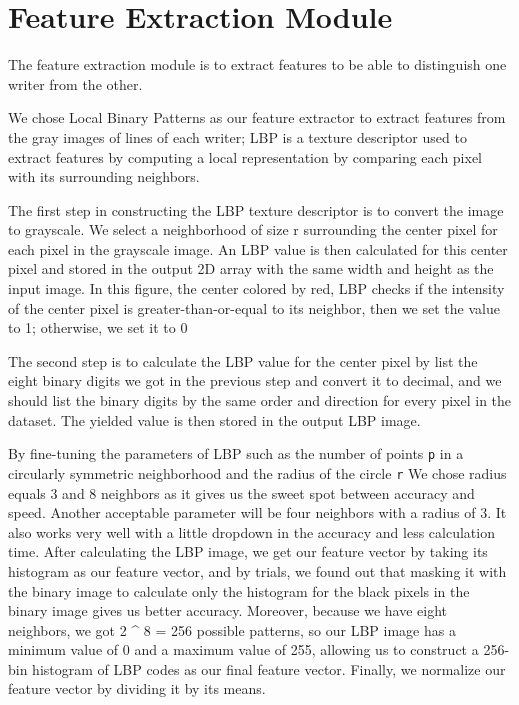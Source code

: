 \section{Feature Extraction Module}
The feature extraction module is to extract features to be able to distinguish one writer from the other.

We chose Local Binary Patterns as our feature extractor to extract features from the gray images of lines of each writer; LBP is a texture descriptor used to extract features by computing a local representation by comparing each pixel with its surrounding neighbors.

The first step in constructing the LBP texture descriptor is to convert the image to grayscale. We select a neighborhood of size r surrounding the center pixel for each pixel in the grayscale image. An LBP value is then calculated for this center pixel and stored in the output 2D array with the same width and height as the input image.
In this figure, the center colored by red, LBP checks if the intensity of the center pixel is greater-than-or-equal to its neighbor, then we set the value to 1; otherwise, we set it to 0

The second step is to calculate the LBP value for the center pixel by list the eight binary digits we got in the previous step and convert it to decimal, and we should list the binary digits by the same order and direction for every pixel in the dataset.
The yielded value is then stored in the output LBP image.

By fine-tuning the parameters of LBP such as the number of points \texttt{p} in a circularly symmetric neighborhood and the radius of the circle \texttt{r}
We chose radius equals 3 and 8 neighbors as it gives us the sweet spot between accuracy and speed. Another acceptable parameter will be four neighbors with a radius of 3. It also works very well with a little dropdown in the accuracy and less calculation time.
After calculating the LBP image, we get our feature vector by taking its histogram as our feature vector, and by trials, we found out that masking it with the binary image to calculate only the histogram for the black pixels in the binary image gives us better accuracy.
Moreover, because we have eight neighbors, we got 2 ^ 8 = 256 possible patterns, so our LBP image has a minimum value of 0 and a maximum value of 255, allowing us to construct a 256-bin histogram of LBP codes as our final feature vector.
Finally, we normalize our feature vector by dividing it by its means.